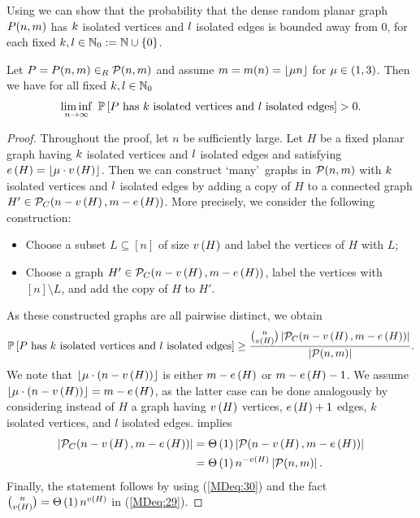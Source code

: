 Using  we can show that the probability that the dense random planar graph $P(n,m)$ has $k$ isolated vertices and $l$ isolated edges is bounded away from 0, for each fixed $k,l\in\mathbb{N}_0:=\mathbb{N}\cup\left\{0\right\}$.
\begin{lem}\label{MDlem:isolated}
Let $P=P(n,m)\in_R \mathcal{P}(n,m)$ and assume $m=m(n)=\left\lfloor\mu n\right\rfloor$ for $\mu \in(1,3)$. Then we have for all fixed $k,l\in\mathbb{N}_0$ 
\begin{align*}
\liminf_{n\to \infty}~ \mathbb{P}\left[P \text{ has }k \text{ isolated vertices and }l \text{ isolated edges}\right]>0.
\end{align*}
\end{lem}
\begin{proof}
Throughout the proof, let $n$ be sufficiently large. Let $H$ be a fixed planar graph having $k$ isolated vertices and $l$ isolated edges and satisfying $e\left({H}\right)=\left\lfloor\mu\cdot v\left({H}\right)\right\rfloor$. Then we can construct \lq many\rq\ graphs in $\mathcal{P}(n,m)$ with $k$ isolated vertices and $l$ isolated edges by adding a copy of $H$ to a connected graph $H'\in \mathcal{P}_C(n-v\left({H}\right),m-e\left({H}\right))$. More precisely, we consider the following construction:
\begin{itemize}
\item Choose a subset $L\subseteq [n]$ of size $v\left({H}\right)$ and label the vertices of $H$ with $L$;
\item
Choose a graph $H'\in \mathcal{P}_C(n-v\left({H}\right),m-e\left({H}\right))$, label the vertices with $[n]\setminus L$, and add the copy of $H$ to $H'$.
\end{itemize}
As these constructed graphs are all pairwise distinct, we obtain
\begin{align}\label{MDeq:29}
\mathbb{P}\left[P \text{ has }k \text{ isolated vertices and }l \text{ isolated edges}\right]\geq \frac{\binom{n}{v\left({H}\right)}\left|\mathcal{P}_C(n-v\left({H}\right),m-e\left({H}\right))\right|}{\left|\mathcal{P}(n,m)\right|}.
\end{align}
We note that $\left\lfloor\mu \cdot\left(n-v\left({H}\right)\right)\right\rfloor$ is either $m-e\left({H}\right)$ or $m-e\left({H}\right)-1$. We assume $\left\lfloor\mu \cdot\left(n-v\left({H}\right)\right)\right\rfloor=m-e\left({H}\right)$, as the latter case can be done analogously by considering instead of $H$ a graph having $v\left({H}\right)$ vertices, $e\left({H}\right)+1$ edges, $k$ isolated vertices, and $l$ isolated edges.  implies
\begin{align}\label{MDeq:30}
\left|\mathcal{P}_C(n-v\left({H}\right),m-e\left({H}\right))\right|&=\Theta\left(1\right)\left|\mathcal{P}(n-v\left({H}\right),m-e\left({H}\right))\right|\nonumber
\\
&=\Theta\left(1\right)n^{-v\left({H}\right)}\left|\mathcal{P}(n,m)\right|.
\end{align}
Finally, the statement follows by using (\ref{MDeq:30}) and the fact 
$\binom{n}{v\left({H}\right)}=\Theta\left(1\right)n^{v\left({H}\right)}$ in (\ref{MDeq:29}).
\end{proof}

